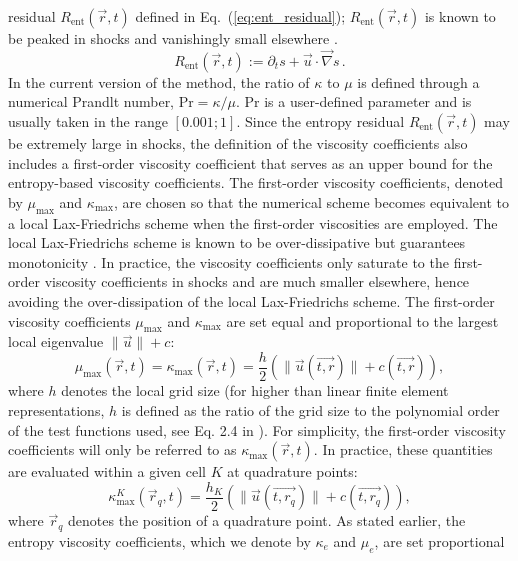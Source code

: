 \documentclass[review,10pt]{elsarticle}
\newcommand{\grad}{\vec{\nabla}}
\renewcommand{\Pr}{\textrm{Pr}}
\newcommand{\resi}{R_\text{ent}}
\newcommand{\eqt}[1]{Eq.~(\ref{#1})}                     %
\begin{document}
residual $\resi(\vec{r},t)$ defined in \eqt{eq:ent_residual}; $\resi(\vec{r},t)$ is known to be 
peaked in shocks and vanishingly small elsewhere \cite{Toro}. 
%
\begin{equation}
\label{eq:ent_residual}
\resi(\vec{r}, t) := \partial_t s + \vec{u} \cdot \grad s \,.
\end{equation}
%
In the current version of the method, the ratio of $\kappa$ to $\mu$ is defined through a numerical 
Prandlt number, $\Pr = \kappa / \mu$.  $\Pr$ is a user-defined parameter and is usually taken in the 
range $[ 0.001; 1 ]$. Since the entropy residual $\resi(\vec{r},t)$ may be extremely large in shocks, 
the definition of the viscosity coefficients also includes a first-order viscosity coefficient that 
serves as an upper bound for the entropy-based viscosity coefficients. The first-order viscosity 
coefficients, denoted by $\mu_{\max}$ and $\kappa_{\max}$, are chosen so that the numerical scheme 
becomes equivalent to a local Lax-Friedrichs scheme \cite{lf} when the first-order viscosities are employed. 
The local Lax-Friedrichs 
scheme is known to be over-dissipative but guarantees monotonicity \cite{Toro}. In practice, the 
viscosity coefficients only saturate to the first-order viscosity coefficients in shocks and are 
much smaller elsewhere, hence avoiding the over-dissipation of the local Lax-Friedrichs scheme. The first-order 
viscosity coefficients $\mu_{\max}$ and $\kappa_{\max}$ are set equal and proportional to the 
largest local eigenvalue $\| \vec{u} \| + c $:
%
\begin{equation}
\label{eq:fo}
\mu_{\max}(\vec{r}, t) = \kappa_{\max}(\vec{r}, t) = \frac{h}{2} \left( \| \vec{u}(\vec{t,r}) \| + c(\vec{t,r}) \right),
\end{equation}
%
where $h$ denotes the local grid size (for higher than linear finite element representations, $h$ is defined 
as the ratio of the grid size to the polynomial order of the test functions used, see Eq. 2.4 in \cite{valentin}). 
For simplicity, the first-order viscosity coefficients will only be referred to as $\kappa_{\max}(\vec{r}, t)$. 
In practice, these quantities are evaluated within a given cell $K$ at quadrature points:
%
\begin{equation}
\label{eq:fo_quad}
\kappa^K_{\max}(\vec{r}_q, t) = \frac{h_K}{2} \left( \| \vec{u}(\vec{t,r_q}) \| + c(\vec{t,r_q}) \right),
\end{equation}
%
where $\vec{r}_q$ denotes the position of a quadrature point.
As stated earlier, the entropy viscosity coefficients, which we denote by $\kappa_e$ and $\mu_e$, are set proportional 
\end{document}
